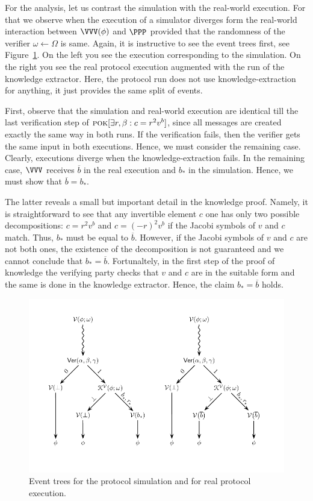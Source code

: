 \documentclass{crypto-exercise}
\begin{document}
\begin{solution}
For the analysis, let us contrast the simulation with the real-world execution. For that we  observe when the execution of a simulator diverges form the real-world interaction between $\VVV(\phi)$ and  $\PPP$ provided that the randomness of the verifier $\omega\gets\Omega$ is same. Again, it is instructive to see the event trees first, see Figure~\ref{fig:event-trees}. 
On the left you see the execution corresponding to the simulation. On the right you see the real protocol execution augmented with the run of the knowledge extractor. Here, the protocol run does not use knowledge-extraction for anything, it just provides the same split of events.   
 
First, observe that the simulation and real-world execution are identical till the last verification step of $\textsc{pok}[\exists r, \beta: c = r^2v^b]$, since all messages are created exactly the same way in both runs. If the verification fails, then the verifier gets the same input in both executions. Hence, we must consider the remaining case. Clearly, executions diverge when the knowledge-extraction fails. In the remaining case, $\VVV$ receives $\overline{b}$ in the real execution and $b_*$ in the simulation. Hence, we must show that $\overline{b}=b_*$. 

The latter reveals a small but important detail in the knowledge proof. Namely, it is straightforward to see that any invertible element $c$ one has only two possible decompositions: $c=r^2v^b$ and $c=(-r)^2v^b$ if the Jacobi symbols of $v$ and $c$ match.
Thus, $b_*$ must be equal to $\overline{b}$. However, if the Jacobi symbols of $v$ and $c$ are not both ones, the existence of the decomposition is not guaranteed and we cannot conclude that $b_*=\overline{b}$. Fortunaltely, in the first step of the proof of knowledge the verifying party checks that $v$ and $c$ are in the suitable form and the same is done in the knowledge extractor. Hence, the claim $b_*=\overline{b}$ holds. 

\begin{figure}[!h]
   \centering
   \includegraphics[scale=0.85]{figures/1102-event-tree-i}
   \caption{Event trees for the protocol simulation and for real protocol execution.}
   \label{fig:event-trees}
\end{figure}


\end{solution}
\end{document}
